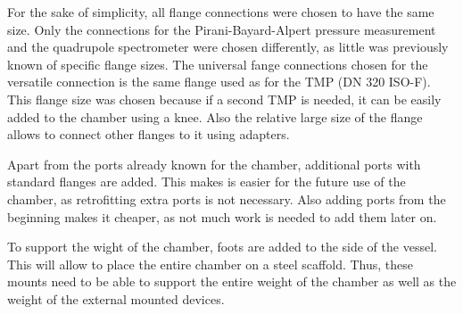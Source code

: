 For the sake of simplicity, all flange connections were chosen to have the same size.
Only the connections for the Pirani-Bayard-Alpert pressure measurement and the quadrupole spectrometer were chosen differently, as little was previously known of specific flange sizes.
The universal fange connections chosen for the versatile connection is the same flange used as for the TMP (DN 320 ISO-F).
This flange size was chosen because if a second TMP is needed, it can be easily added to the chamber using a knee.
Also the relative large size of the flange allows to connect other flanges to it using adapters.

Apart from the ports already known for the chamber, additional ports with standard flanges are added.
This makes is easier for the future use of the chamber, as retrofitting extra ports is not necessary.
Also adding ports from the beginning makes it cheaper, as not much work is needed to add them later on.

To support the wight of the chamber, foots are added to the side of the vessel.
This will allow to place the entire chamber on a steel scaffold.
Thus, these mounts need to be able to support the entire weight of the chamber as well as the weight of the external mounted devices.

